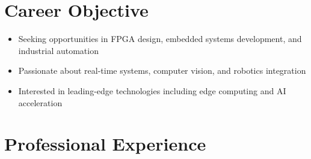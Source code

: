 \documentclass[11pt,a4paper]{article}
\begin{document}
\section{Career Objective}
\begin{itemize}
    \item Seeking opportunities in FPGA design, embedded systems development, and industrial automation
    \item Passionate about real-time systems, computer vision, and robotics integration
    \item Interested in leading-edge technologies including edge computing and AI acceleration
\end{itemize}

\section{Professional Experience}
\end{document}
